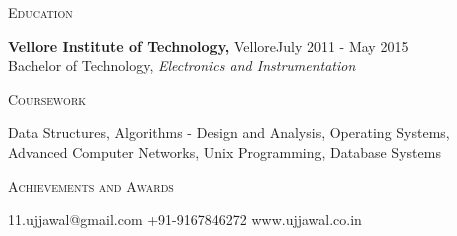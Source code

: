 \documentclass[a4paper, 11pt]{article}
\begin{document}
\vspace{5mm}

\begin{minipage}[t]{0.15\textwidth}
	\small \textsc{Education}
\end{minipage}
\hfill
\begin{minipage}[t]{0.80\textwidth}
	\noindent \textbf{Vellore Institute of Technology,} Vellore\hfill {\scriptsize \textrm{July 2011 - May 2015}}\\
	\small Bachelor of Technology, \textit{Electronics and Instrumentation}\\
\end{minipage}

\vspace{5mm}

\begin{minipage}[t]{0.15\textwidth}
	\small \textsc{Coursework}
\end{minipage}
\hfill
\begin{minipage}[t]{0.80\textwidth}
	\noindent Data Structures, Algorithms - Design and Analysis, Operating Systems, Advanced Computer Networks, Unix Programming, Database Systems
\end{minipage}

\vspace{5mm}

\begin{minipage}[t]{0.15\textwidth}
	\flushleft
	\small \textsc{Achievements and Awards}
\end{minipage}
\hfill
\begin{minipage}[t]{0.80\textwidth}
\end{minipage}

\vspace{5mm}
\vspace*{\fill}
\hrulefill 

\color{blue} {11.ujjawal@gmail.com \hfill +91-9167846272 \hfill www.ujjawal.co.in}
\end{document}
